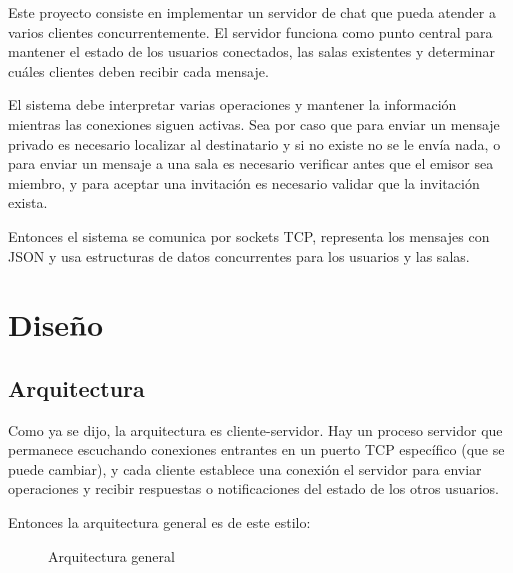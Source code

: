 \documentclass[12pt,letterpaper]{article}
\begin{document}
Este proyecto consiste en implementar un servidor de chat que pueda
atender a varios clientes concurrentemente. El servidor funciona como
punto central para mantener el estado de los usuarios
conectados, las salas existentes y determinar cuáles clientes deben
recibir cada mensaje.

El sistema debe
interpretar varias operaciones y mantener la información mientras las conexiones siguen activas. Sea por caso que para
enviar un mensaje privado es necesario localizar al destinatario y si no existe no se le envía nada, o para enviar un mensaje a una sala es necesario verificar antes que el emisor sea
miembro, y para aceptar una invitación es necesario validar que
la invitación exista.

Entonces el sistema se comunica por sockets TCP, representa los mensajes con JSON y usa estructuras de datos concurrentes para los usuarios y las salas.

\section{Diseño}
\subsection{Arquitectura}

Como ya se dijo, la arquitectura es cliente-servidor. Hay un proceso
servidor que permanece escuchando conexiones entrantes en un puerto TCP
específico (que se puede cambiar), y cada cliente establece una conexión el servidor para enviar operaciones y recibir respuestas o
notificaciones del estado de los otros usuarios.

Entonces la arquitectura general es de este estilo:

\begin{figure}[H]
\centering
{}

\caption{Arquitectura general}
\label{fig:arquitectura}
\end{figure}
\end{document}
